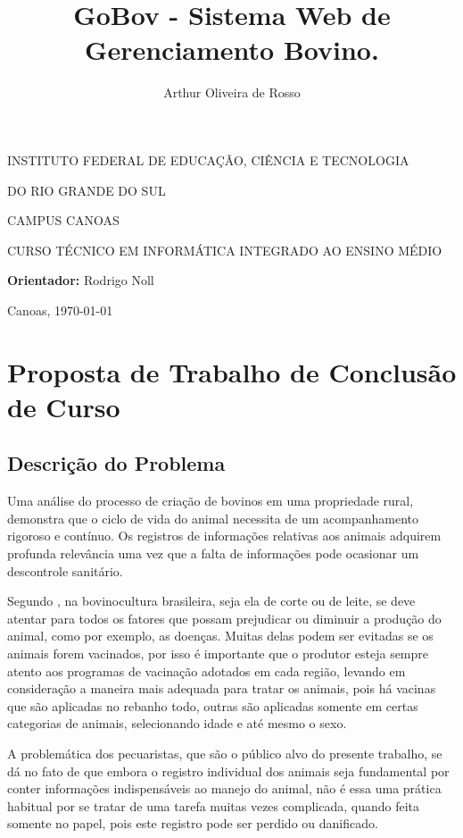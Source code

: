 \documentclass[12pt]{article}
\author{Arthur Oliveira de Rosso}
\title{GoBov - Sistema Web de Gerenciamento Bovino.}
\begin{document}
\makeatletter
\begin{titlepage}
	\begin{center}

		INSTITUTO FEDERAL DE EDUCAÇÃO, CIÊNCIA E TECNOLOGIA 

		DO RIO GRANDE DO SUL

		CAMPUS CANOAS

		CURSO TÉCNICO EM INFORMÁTICA INTEGRADO AO ENSINO MÉDIO

		\vfill
		\vfill

		\@author

		\vfill

		\textbf{\@title}

		\vfill

		\textbf{Orientador:} Rodrigo Noll

		\vfill

		Canoas, \today

	\end{center}
\end{titlepage}
\newpage


\section{Proposta de Trabalho de Conclusão de Curso}

\subsection{Descrição do Problema}
Uma análise do processo de criação de bovinos em uma propriedade rural, demonstra que o ciclo de vida do animal necessita de um acompanhamento rigoroso e contínuo. Os registros de informações relativas aos animais adquirem profunda relevância uma vez que a falta de informações pode ocasionar um descontrole sanitário.

Segundo , na bovinocultura brasileira, seja ela de corte ou de leite, se deve atentar para todos os fatores que possam prejudicar ou diminuir a produção do animal, como por exemplo, as doenças. Muitas  delas podem ser evitadas se os animais forem vacinados, por isso é importante que o produtor esteja sempre atento aos programas de vacinação adotados em cada região, levando em consideração a maneira mais adequada para tratar os animais, pois há vacinas que são aplicadas no rebanho todo, outras são aplicadas somente em certas categorias de animais, selecionando idade e até mesmo o sexo.

A problemática dos pecuaristas, que são o público alvo do presente trabalho, se dá no fato de que embora o registro individual dos animais seja fundamental por conter informações indispensáveis ao manejo do animal, não é essa uma prática habitual por se tratar de uma tarefa muitas vezes complicada, quando feita somente no papel, pois este registro pode ser perdido ou danificado.
\end{document}
